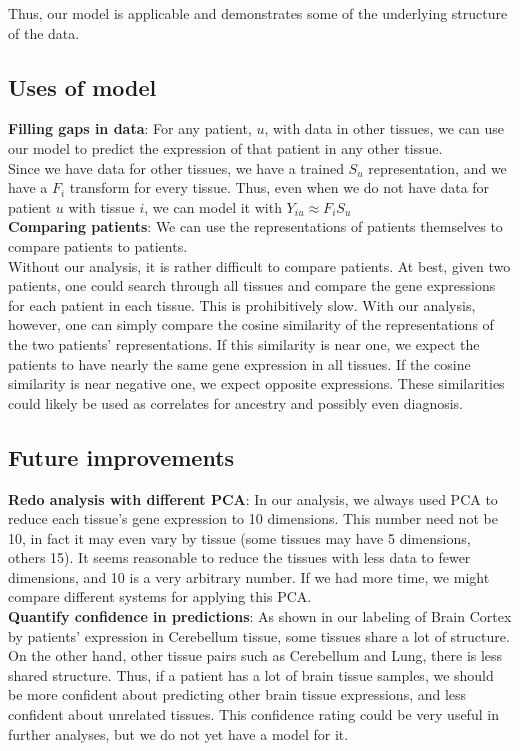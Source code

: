 \documentclass{article}
\newcommand{\hs}[1]{\hspace*{#1 cm}}
\begin{document}
Thus, our model is applicable and demonstrates some of the underlying structure of the data.

\subsection{Uses of model}
\hs{1}

{\bf Filling gaps in data}: For any patient, $u$, with data in other tissues, we can use our model to predict the expression of that patient in any other tissue. \\
Since we have data for other tissues, we have a trained $S_u$ representation, and we have a $F_i$ transform for every tissue. Thus, even when we do not have data for patient $u$ with tissue $i$, we can model it with $Y_{iu} \approx F_i S_u$ \\

{\bf Comparing patients}: We can use the representations of patients themselves to compare patients to patients. \\
Without our analysis, it is rather difficult to compare patients. At best, given two patients, one could search through all tissues and compare the gene expressions for each patient in each tissue. This is prohibitively slow. With our analysis, however, one can simply compare the cosine similarity of the representations of the two patients' representations. If this similarity is near one, we expect the patients to have nearly the same gene expression in all tissues. If the cosine similarity is near negative one, we expect opposite expressions. These similarities could likely be used as correlates for ancestry and possibly even diagnosis. \\



\subsection{Future improvements}
\hs{1}

{\bf Redo analysis with different PCA}: In our analysis, we always used PCA to reduce each tissue's gene expression to 10 dimensions. This number need not be 10, in fact it may even vary by tissue (some tissues may have 5 dimensions, others 15). It seems reasonable to reduce the tissues with less data to fewer dimensions, and 10 is a very arbitrary number. If we had more time, we might compare different systems for applying this PCA. \\

{\bf Quantify confidence in predictions}: As shown in our labeling of Brain Cortex by patients' expression in Cerebellum tissue, some tissues share a lot of structure. On the other hand, other tissue pairs such as Cerebellum and Lung, there is less shared structure. Thus, if a patient has a lot of brain tissue samples, we should be more confident about predicting other brain tissue expressions, and less confident about unrelated tissues. This confidence rating could be very useful in further analyses, but we do not yet have a model for it.
\end{document}

